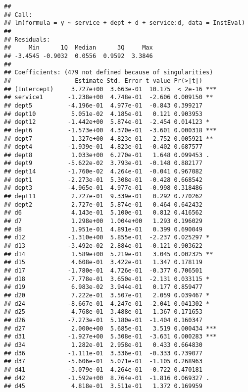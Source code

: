 \documentclass[
]{article}
\begin{document}
\begin{verbatim}
## 
## Call:
## lm(formula = y ~ service + dept + d + service:d, data = InstEval)
## 
## Residuals:
##     Min      1Q  Median      3Q     Max 
## -3.4545 -0.9032  0.0556  0.9592  3.3846 
## 
## Coefficients: (479 not defined because of singularities)
##                  Estimate Std. Error t value Pr(>|t|)    
## (Intercept)     3.727e+00  3.663e-01  10.175  < 2e-16 ***
## service1       -1.238e+00  4.748e-01  -2.606 0.009150 ** 
## dept5          -4.196e-01  4.977e-01  -0.843 0.399217    
## dept10          5.051e-02  4.185e-01   0.121 0.903953    
## dept12         -1.442e+00  5.874e-01  -2.454 0.014123 *  
## dept6          -1.573e+00  4.370e-01  -3.601 0.000318 ***
## dept7          -1.327e+00  4.823e-01  -2.752 0.005921 ** 
## dept4          -1.939e-01  4.823e-01  -0.402 0.687577    
## dept8           1.033e+00  6.270e-01   1.648 0.099453 .  
## dept9          -5.622e-02  3.793e-01  -0.148 0.882177    
## dept14         -1.760e-02  4.264e-01  -0.041 0.967082    
## dept1          -2.273e-01  5.308e-01  -0.428 0.668542    
## dept3          -4.965e-01  4.977e-01  -0.998 0.318486    
## dept11          2.727e-01  9.339e-01   0.292 0.770262    
## dept2           2.727e-01  5.874e-01   0.464 0.642432    
## d6              4.143e-01  5.100e-01   0.812 0.416562    
## d7              1.298e+00  1.004e+00   1.293 0.196029    
## d8              1.951e-01  4.891e-01   0.399 0.690049    
## d12            -1.310e+00  5.855e-01  -2.237 0.025297 *  
## d13            -3.492e-02  2.884e-01  -0.121 0.903622    
## d14             1.589e+00  5.219e-01   3.045 0.002325 ** 
## d15             4.608e-01  3.422e-01   1.347 0.178119    
## d17            -1.780e-01  4.726e-01  -0.377 0.706501    
## d18            -7.778e-01  3.650e-01  -2.131 0.033115 *  
## d19             6.983e-02  3.944e-01   0.177 0.859477    
## d20             7.222e-01  3.507e-01   2.059 0.039467 *  
## d24            -8.667e-01  4.247e-01  -2.041 0.041302 *  
## d25             4.768e-01  3.488e-01   1.367 0.171653    
## d26            -7.273e-01  5.180e-01  -1.404 0.160347    
## d27             2.000e+00  5.685e-01   3.519 0.000434 ***
## d31            -1.927e+00  5.308e-01  -3.631 0.000283 ***
## d34             1.282e-01  2.958e-01   0.433 0.664830    
## d36            -1.111e-01  3.336e-01  -0.333 0.739077    
## d37            -5.606e-01  5.071e-01  -1.105 0.268963    
## d41            -3.079e-01  4.264e-01  -0.722 0.470181    
## d42            -1.592e+00  8.764e-01  -1.816 0.069327 .  
## d45             4.818e-01  3.511e-01   1.372 0.169959    

\end{verbatim}
\end{document}
